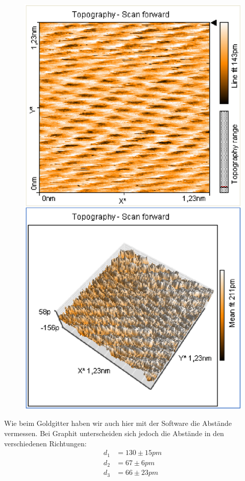 \documentclass[12pt]{article}
\begin{document}
\begin{figure}[H]
\begin{minipage}{0.4\linewidth}
\includegraphics[width=0.9\linewidth]{../plot/data/graphit/graphit5.eps}
\end{minipage}
\end{figure}

Wie beim Goldgitter haben wir auch hier mit der Software die Abstände vermessen. Bei Graphit unterscheiden sich jedoch die Abstände in den verschiedenen Richtungen:
\begin{align*}
 d_1 &= 130 \pm 15 pm \\
 d_2 &= 67 \pm 6 pm \\
 d_3 &= 66 \pm 23 pm
\end{align*}
\end{document}
